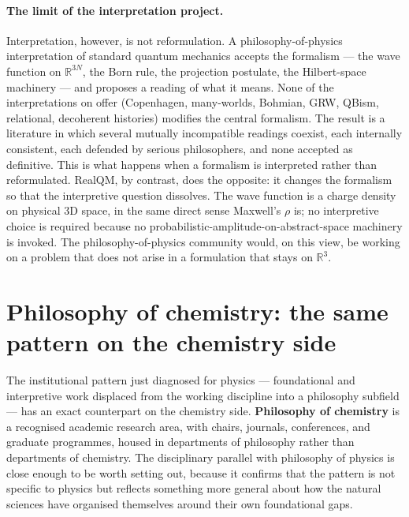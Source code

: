 \paragraph{The limit of the interpretation project.}
Interpretation, however, is not reformulation. A philosophy-of-physics interpretation of standard quantum mechanics accepts the formalism --- the wave function on $\mathbb{R}^{3N}$, the Born rule, the projection postulate, the Hilbert-space machinery --- and proposes a reading of what it means. None of the interpretations on offer (Copenhagen, many-worlds, Bohmian, GRW, QBism, relational, decoherent histories) modifies the central formalism. The result is a literature in which several mutually incompatible readings coexist, each internally consistent, each defended by serious philosophers, and none accepted as definitive. This is what happens when a formalism is interpreted rather than reformulated. RealQM, by contrast, does the opposite: it changes the formalism so that the interpretive question dissolves. The wave function is a charge density on physical 3D space, in the same direct sense Maxwell's $\rho$ is; no interpretive choice is required because no probabilistic-amplitude-on-abstract-space machinery is invoked. The philosophy-of-physics community would, on this view, be working on a problem that does not arise in a formulation that stays on $\mathbb{R}^3$.

\section{Philosophy of chemistry: the same pattern on the chemistry side}\label{sec:philosophy-of-chemistry}

The institutional pattern just diagnosed for physics --- foundational and interpretive work displaced from the working discipline into a philosophy subfield --- has an exact counterpart on the chemistry side. \textbf{Philosophy of chemistry} is a recognised academic research area, with chairs, journals, conferences, and graduate programmes, housed in departments of philosophy rather than departments of chemistry. The disciplinary parallel with philosophy of physics is close enough to be worth setting out, because it confirms that the pattern is not specific to physics but reflects something more general about how the natural sciences have organised themselves around their own foundational gaps.

